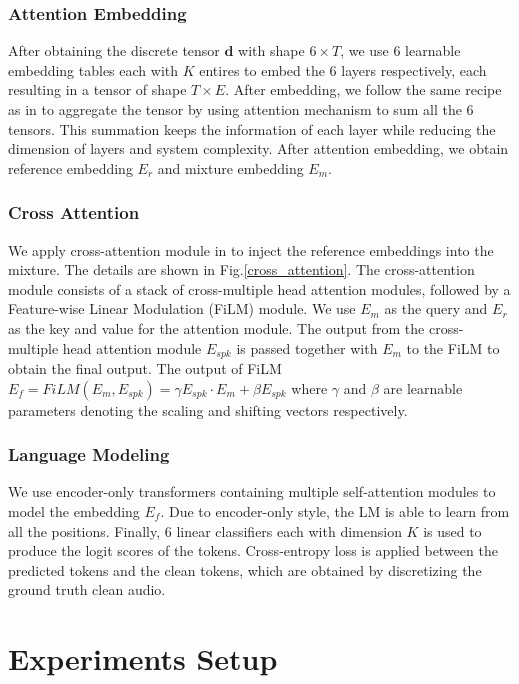 \documentclass[conference]{IEEEtran}
\begin{document}
\subsubsection{Attention Embedding}
After obtaining the discrete tensor \(\bm{d}\) with shape \(6 \times T\), we use 6
learnable embedding tables each with \(K\) entires to embed the 6 layers 
respectively, each resulting in a tensor of shape \(T \times E\). 
After embedding, we follow the same recipe as in \cite{dasb} to 
aggregate the tensor by using attention mechanism to sum all the 6 tensors. This summation 
keeps the information of each layer while reducing the 
dimension of layers and system complexity. After attention embedding, we obtain reference embedding \(E_r\) and 
mixture embedding \(E_m\).

\subsubsection{Cross Attention}
We apply cross-attention module in \cite{usef_tes} to inject the reference embeddings into the mixture. The details 
are shown in Fig.\ref{cross_attention}.
The cross-attention module consists of a stack of cross-multiple head attention modules, followed by
a Feature-wise Linear Modulation (FiLM) module. 
We use \(E_m\) as the query and \(E_r\) as the key and value for 
the attention module. The output from the cross-multiple head attention module \(E_{spk}\)
is passed together with \(E_m\) to the FiLM to obtain the final output. The output of 
FiLM  \(E_f = FiLM(E_m, E_{spk}) = \gamma E_{spk} \cdot E_m  + \beta E_{spk} \) where 
\(\gamma\) and \(\beta\) are learnable parameters denoting the scaling and shifting vectors 
respectively.

\subsubsection{Language Modeling}
We use encoder-only transformers containing multiple self-attention modules to model the 
embedding \(E_f\). Due to encoder-only style, the LM is able to learn from all the positions. 
Finally, 6 linear classifiers each with dimension \(K\) is used to produce the logit scores of the tokens.
Cross-entropy loss is applied between the predicted tokens and the clean tokens, which are obtained by discretizing the ground truth clean audio.

\section{Experiments Setup}
\end{document}
